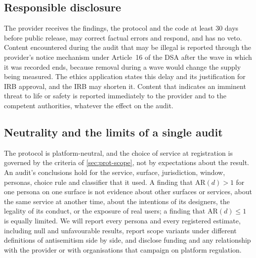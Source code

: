 \subsection{Responsible disclosure}\label{sec:eth-disclosure}

The provider receives the findings, the protocol and the code at least 30 days before public release, may correct factual errors and respond, and has no veto. Content encountered during the audit that may be illegal is reported through the provider's notice mechanism under Article~16 of the DSA \citep{eu2022dsa} after the wave in which it was recorded ends, because removal during a wave would change the supply being measured. The ethics application states this delay and its justification for IRB approval, and the IRB may shorten it. Content that indicates an imminent threat to life or safety is reported immediately to the provider and to the competent authorities, whatever the effect on the audit.

\subsection{Neutrality and the limits of a single audit}\label{sec:eth-neutrality}

The protocol is platform-neutral, and the choice of service at registration is governed by the criteria of \cref{sec:prot-scope}, not by expectations about the result. An audit's conclusions hold for the service, surface, jurisdiction, window, personas, choice rule and classifier that it used. A finding that $\mathrm{AR}(d)>1$ for one persona on one surface is not evidence about other surfaces or services, about the same service at another time, about the intentions of its designers, the legality of its conduct, or the exposure of real users; a finding that $\mathrm{AR}(d)\le1$ is equally limited. We will report every persona and every registered estimate, including null and unfavourable results, report scope variants under different definitions of antisemitism side by side, and disclose funding and any relationship with the provider or with organisations that campaign on platform regulation.
